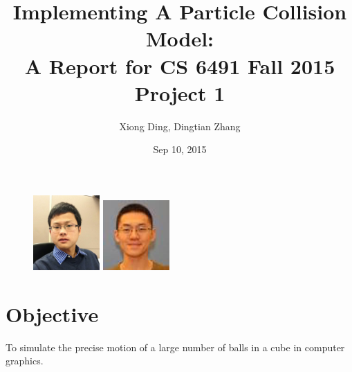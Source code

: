 \documentclass[twoside,11pt]{article}
\begin{document}
\title{Implementing A Particle Collision Model: \\ \large A Report for CS 6491 Fall 2015 Project 1}
\author{Xiong Ding, Dingtian Zhang}
\date{Sep 10, 2015}
\maketitle
\begin{figure} [H]
    \centering
    \includegraphics[width=1.0in]{selfie}
    \includegraphics[width=1.0in]{pic_alan}
\end{figure}




\section{Objective}

To simulate the precise motion of a large number of balls in a cube in computer graphics. 
\end{document}
